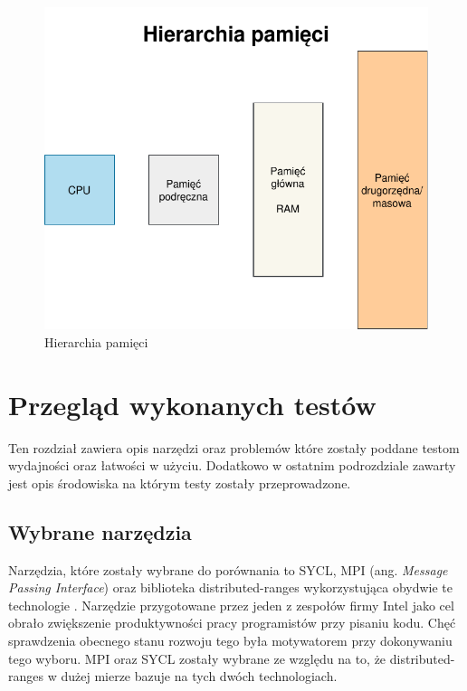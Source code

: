 \documentclass[a4paper,12pt]{book} %
\begin{document}
\begin{figure}[h]
	\centering
	\includegraphics[scale=0.9]{assets/hierarchia_pamieci.pdf}
	\caption{Hierarchia pamięci}
	\label{hierarchia_pamieci}
\end{figure}

\chapter{Przegląd wykonanych testów}
Ten rozdział zawiera opis narzędzi oraz problemów które zostały poddane testom wydajności oraz łatwości w użyciu. Dodatkowo w ostatnim podrozdziale zawarty jest opis środowiska na którym testy zostały przeprowadzone.
\section{Wybrane narzędzia}
Narzędzia, które zostały wybrane do porównania to SYCL, MPI (ang. \emph{Message Passing Interface}) oraz biblioteka distributed-ranges wykorzystująca obydwie te technologie \cite{SYCL, MPI, dist-ranges}. Narzędzie przygotowane przez jeden z zespołów firmy Intel jako cel obrało zwiększenie produktywności pracy programistów przy pisaniu kodu. Chęć sprawdzenia obecnego stanu rozwoju tego była motywatorem przy dokonywaniu tego wyboru. MPI oraz SYCL zostały wybrane ze względu na to, że distributed-ranges w dużej mierze bazuje na tych dwóch technologiach.
\end{document}
